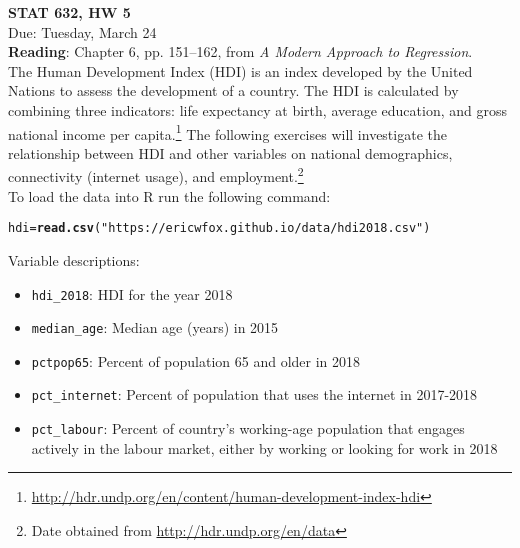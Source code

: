 \documentclass[11pt]{article}\usepackage[]{graphicx}\usepackage[]{color}
\makeatletter
\newcommand{\hlstr}[1]{\textcolor[rgb]{0.192,0.494,0.8}{#1}}%
\newcommand{\hlstd}[1]{\textcolor[rgb]{0.345,0.345,0.345}{#1}}%
\newcommand{\hlkwb}[1]{\textcolor[rgb]{0.69,0.353,0.396}{#1}}%
\newcommand{\hlkwd}[1]{\textcolor[rgb]{0.737,0.353,0.396}{\textbf{#1}}}%
\newenvironment{kframe}{%
 \def\at@end@of@kframe{}%
 \ifinner\ifhmode%
  \def\at@end@of@kframe{\end{minipage}}%
  \begin{minipage}{\columnwidth}%
 \fi\fi%
 \def\FrameCommand##1{\hskip\@totalleftmargin \hskip-\fboxsep
 \colorbox{shadecolor}{##1}\hskip-\fboxsep
     \hskip-\linewidth \hskip-\@totalleftmargin \hskip\columnwidth}%
 \MakeFramed {\advance\hsize-\width
   \@totalleftmargin\z@ \linewidth\hsize
   \@setminipage}}%
 {\par\unskip\endMakeFramed%
 \at@end@of@kframe}
\newenvironment{knitrout}{}{} %
\makeatother
\begin{document}
\setlength\parindent{0pt}

\textbf{STAT 632, HW 5}\\
Due: Tuesday, March 24\\

\textbf{Reading}: Chapter 6, pp. 151--162, from \emph{A Modern Approach to Regression}.\\

The Human Development Index (HDI) is an index developed by the United Nations to assess the development of a country.   The HDI is calculated by combining three indicators: life expectancy at birth, average education,  and gross national income per capita.\footnote{\url{http://hdr.undp.org/en/content/human-development-index-hdi}}  The following exercises will investigate the relationship between HDI and other variables on national demographics, connectivity (internet usage), and employment.\footnote{Date obtained from \url{http://hdr.undp.org/en/data}}\\  

To load the data into R run the following command:
\begin{knitrout}
\color{fgcolor}\begin{kframe}
\begin{alltt}
\hlstd{hdi} \hlkwb{=} \hlkwd{read.csv}\hlstd{(}\hlstr{"https://ericwfox.github.io/data/hdi2018.csv"}\hlstd{)}
\end{alltt}
\end{kframe}
\end{knitrout}
Variable descriptions:
\begin{itemize}
\item \texttt{hdi\_2018}: HDI for the year 2018
\item \texttt{median\_age}: Median age (years) in 2015
\item \texttt{pctpop65}: Percent of population 65 and older in 2018
\item \texttt{pct\_internet}: Percent of population that uses the internet in 2017-2018
\item \texttt{pct\_labour}: Percent of country's working-age population that engages actively in the labour market, either by working or looking for work in 2018\\
\end{itemize} 
\end{document}
